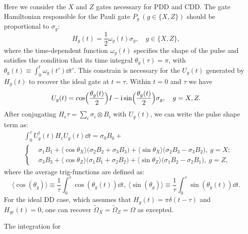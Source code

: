 \documentclass[b5paper,11pt]{article}
\newcommand{\wt}[1]{\widetilde{#1}}
\begin{document}
Here we consider the $X$ and $Z$ gates necessary for PDD and CDD.
The gate Hamiltonian responsible for the Pauli gate $P_g\ (g\in\{X,Z\})$ should be proportional to $\sigma_g$:
\begin{equation}
 H_g(t) = \frac{1}{2}\omega_g(t)\sigma_g,\quad g\in\{X,Z\},
\end{equation}
where the time-dependent function $\omega_g(t)$ specifies the shape of the pulse and satisfies the condition that its time integral $\theta_g(\tau)=\pi$, with $\theta_g(t)\equiv \int_0^t \omega_g(t') \dd t'$.
This constrain is necessary for the $U_g(t)$ generated by $H_g(t)$
to recover the ideal gate at $t=\tau$. Within $t=0$ and $\tau$ we have 
\begin{equation}
 U_g(t) = \cos\Bigl(\frac{\theta_g(t)}{2} \Bigr) I -\mathrm{i} \sin\Bigl(\frac{\theta_g(t)}{2} \Bigr)\sigma_g,\quad
 g = X,Z.
\end{equation}
After conjugating $H_e\tau = \sum_i \sigma_i \otimes B_i$ with $U_g(t)$,
we can write the pulse shape term as:
\begin{equation}\label{eq:pshape-term}
\begin{aligned}
&\int_0^\tau\!\! U_g^\dagger(t) H_e U_g(t) \dd t =\sigma_0 B_0  + \\
 & \left\{
 \begin{aligned}
   & \sigma_1 B_1 + 
   \langle \cos\theta_X \rangle \bigl( \sigma_2  B_2 + 
   \sigma_3 B_3 \bigr)+ 
   \langle\sin\theta_X \rangle
    \bigl(\sigma_2 B_3 - \sigma_3 B_2\bigr),\ g=X;\\
    &\sigma_3 B_3  + \langle \cos\theta_Z \rangle \bigl( \sigma_1  B_1 + 
   \sigma_2 B_2 \bigr)+ 
   \langle\sin\theta_Z \rangle
    \bigl(\sigma_1 B_2 - \sigma_2 B_1\bigr),\ g=Z,
 \end{aligned}
 \right.
\end{aligned}
\end{equation}
where the average trig-functions are defined as:
\begin{equation}
 \langle \cos(\theta_g) \rangle \equiv \frac{1}{\tau}\int_0^\tau \cos(\theta_g(t)) \dd t, \ \langle \sin(\theta_g) \rangle \equiv \frac{1}{\tau}\int_0^\tau \sin(\theta_g(t)) \dd t.  
\end{equation}
For the ideal DD case, which assumes that $H_g(t)=\pi\delta(t-\tau)$ and  $H_{ge}(t)=0$, one can recover $\wt \Omega_X =\wt \Omega_Z = \Omega$ as excepted. 

The integration for  
\end{document}
